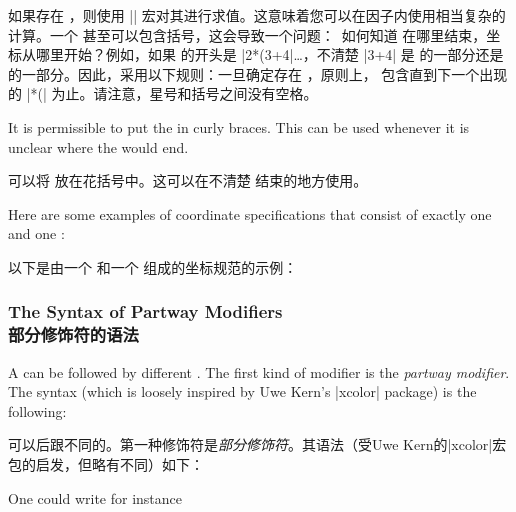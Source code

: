 如果存在 ，则使用 |\pgfmathparse| 宏对其进行求值。这意味着您可以在因子内使用相当复杂的计算。一个  甚至可以包含括号，这会导致一个问题：\tikzname\ 如何知道  在哪里结束，坐标从哪里开始？例如，如果  的开头是 |2*(3+4|\dots，不清楚 |3+4| 是  的一部分还是  的一部分。因此，采用以下规则：一旦确定存在 ，原则上， 包含直到下一个出现的 |*(| 为止。请注意，星号和括号之间没有空格。

It is permissible to put the  in curly braces. This can be used
whenever it is unclear where the  would end.

可以将  放在花括号中。这可以在不清楚  结束的地方使用。

Here are some examples of coordinate specifications that consist of exactly one
 and one :

以下是由一个  和一个  组成的坐标规范的示例：

%
\begin{codeexample}[preamble={\usetikzlibrary{calc}}]
\end{codeexample}


\subsubsection{The Syntax of Partway Modifiers\\部分修饰符的语法}

A  can be followed by different . The first
kind of modifier is the \emph{partway modifier}. The syntax (which is loosely
inspired by Uwe Kern's |xcolor| package) is the following:

可以后跟不同的。第一种修饰符是\emph{部分修饰符}。其语法（受Uwe Kern的|xcolor|宏包的启发，但略有不同）如下：
%
\begin{quote}
\end{quote}
%
One could write for instance

